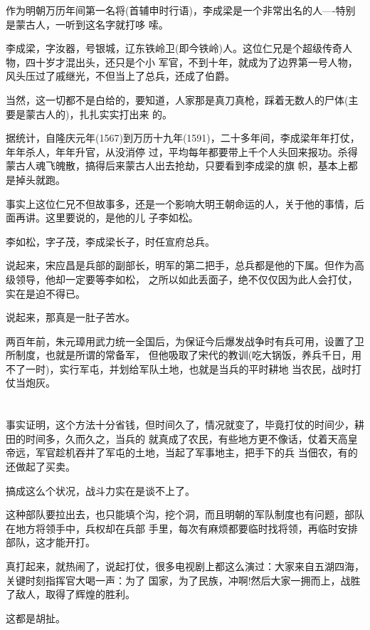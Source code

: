 \documentclass[11pt,a4paper,onecolumn]{article}
\begin{document}
作为明朝万历年间第一名将(首辅申时行语)，李成梁是一个非常出名的人----特别是蒙古人，一听到这名字就打哆
嗦。

李成梁，字汝器，号银城，辽东铁岭卫(即今铁岭)人。这位仁兄是个超级传奇人物，四十岁才混出头，还只是个小
军官，不到十年，就成为了边界第一号人物，风头压过了戚继光，不但当上了总兵，还成了伯爵。

当然，这一切都不是白给的，要知道，人家那是真刀真枪，踩着无数人的尸体(主要是蒙古人的)，扎扎实实打出来
的。

据统计，自隆庆元年(1567)到万历十九年(1591)，二十多年间，李成梁年年打仗，年年杀人，年年升官，从没消停
过，平均每年都要带上千个人头回来报功。杀得蒙古人魂飞魄散，搞得后来蒙古人出去抢劫，只要看到李成梁的旗
帜，基本上都是掉头就跑。

事实上这位仁兄不但故事多，还是一个影响大明王朝命运的人，关于他的事情，后面再讲。这里要说的，是他的儿
子李如松。

李如松，字子茂，李成梁长子，时任宣府总兵。

说起来，宋应昌是兵部的副部长，明军的第二把手，总兵都是他的下属。但作为高级领导，他却一定要等李如松，
之所以如此丢面子，绝不仅仅因为此人会打仗，实在是迫不得已。

说起来，那真是一肚子苦水。

两百年前，朱元璋用武力统一全国后，为保证今后爆发战争时有兵可用，设置了卫所制度，也就是所谓的常备军，
但他吸取了宋代的教训(吃大锅饭，养兵千日，用不了一时)，实行军屯，并划给军队土地，也就是当兵的平时耕地
当农民，战时打仗当炮灰。

\section[\thesection]{}

事实证明，这个方法十分省钱，但时间久了，情况就变了，毕竟打仗的时间少，耕田的时间多，久而久之，当兵的
就真成了农民，有些地方更不像话，仗着天高皇帝远，军官趁机吞并了军屯的土地，当起了军事地主，把手下的兵
当佃农，有的还做起了买卖。

搞成这么个状况，战斗力实在是谈不上了。

这种部队要拉出去，也只能填个沟，挖个洞，而且明朝的军队制度也有问题，部队在地方将领手中，兵权却在兵部
手里，每次有麻烦都要临时找将领，再临时安排部队，这才能开打。

真打起来，就热闹了，说起打仗，很多电视剧上都这么演过：大家来自五湖四海，关键时刻指挥官大喝一声：为了
国家，为了民族，冲啊!然后大家一拥而上，战胜了敌人，取得了辉煌的胜利。

这都是胡扯。
\end{document}
